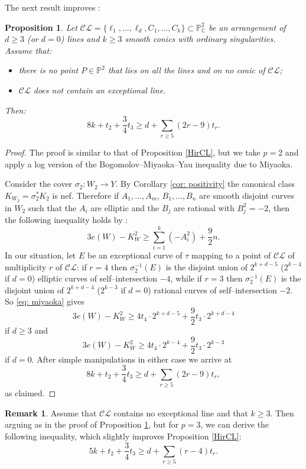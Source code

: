 \documentclass[12pt]{amsart}
\theoremstyle{plain}
\newtheorem{proposition}[thm]{Proposition}
\theoremstyle{definition}
\newtheorem{remark}[thm]{Remark}
\renewcommand\ge{\geqslant}
\renewcommand\geq{\geqslant}
\newcommand\CL{\mathcal{CL}}
\begin{document}
The next result improves  \cite[Theorem 4.2]{PSz2023}:
\begin{proposition}\label{prop: miyaoka}
Let $\mathcal{CL} = \{\ell_{1}, \dots, \ell_{d}, C_{1}, \dots, C_{k}\} \subset \mathbb{P}^{2}_{\mathbb{C}}$ be an arrangement of $d\ge 3$ (or $d=0$) lines  and $k\ge 3$ smooth conics with   ordinary singularities.  Assume that:
\begin{itemize}
\item[(a)] there is no point $P\in \mathbb P^2$ that lies on all the lines and on no conic of $\mathcal{CL}$;
\item[(b)]  $\mathcal{CL}$ does not contain an exceptional line.
\end{itemize}
Then:
$$8k + t_{2} + \frac{3}{4}t_{3} \geq d + \sum_{r\geq 5}(2r-9)t_{r}.$$
\end{proposition}
\begin{proof}
The proof is similar to that of Proposition \ref{HirCL}, but we take $p=2$ and apply a log version of the Bogomolov--Miyaoka--Yau inequality due to Miyaoka.

Consider the cover $\sigma_2\colon W_2\to Y$. By Corollary \ref{cor: positivity} the canonical class $K_{W_2}=\sigma_2^*K_2$ is nef.
Therefore if   $A_{1}, \ldots , A_{m}$, $B_1,\ldots, B_n$ are smooth disjoint  curves in $W_2$ such that the $A_i$ are elliptic and the $B_j$ are rational with $B_j^2=-2$, then the following inequality holds by  \cite[Cor.~1.3]{M84}:
\begin{equation}\label{eq: miyaoka}
3e(W) - K^{2}_W \geq \sum_{i=1}^{k}(-A_{i}^{2}) +\frac{9}{2} n.
\end{equation} 
In our situation, let $E$ be an  exceptional curve of $\tau$ mapping to a   point of $\mathcal{CL}$ of multiplicity $r$ of $\CL$: if $r=4$ then  $\sigma_2^{-1}(E)$ is the disjoint union of $2^{k+d-5}$ ($2^{k-4}$ if $d=0$) elliptic curves of self--intersection $-4$, while  if $r=3$ then $\sigma_2^{-1}(E)$ is the disjoint union of $2^{k+d-4}$ ($2^{k-3}$ if $d=0$) rational curves of self--intersection $-2$.
 So \eqref{eq: miyaoka} gives
$$3e(W) - K_{W}^2 \geq 4t_{4}\cdot 2^{k+d-5}+\frac{9}{2}t_3 \cdot 2^{k+d- 4}$$
if $d\ge 3$ and 
$$3e(W) - K_{W}^2 \geq 4t_{4}\cdot 2^{k-4}+\frac{9}{2}t_3 \cdot 2^{k-3}$$
if $d=0$. 
After simple manipulations  in either case we arrive at 
$$8k + t_{2} + \frac{3}{4}t_{3} \geq d + \sum_{r\geq 5}(2r-9)t_{r},$$
as claimed.
\end{proof}
\begin{remark}\label{rem: p=3}
Assume that $\mathcal{CL}$ contains no exceptional line and that $k\ge 3$. 
Then arguing as in the proof of Proposition  \ref{prop: miyaoka}, but for $p=3$, we can derive the following inequality, which slightly improves Proposition \ref{HirCL}:
$$5k + t_{2} +\frac 34 t_{3} \geq d + \sum_{r\geq 5}(r-4)t_{r}.$$
\end{remark}
\end{document}
